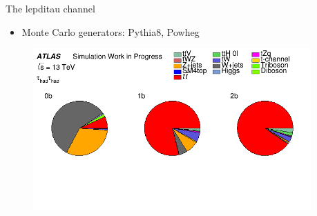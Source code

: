 \begin{frame}{The \tHq lepditau channel}
  \begin{itemize}
  \item Monte Carlo generators: Pythia8, Powheg
\end{itemize}
     \begin{figure}
        \centering
        \includegraphics[width=0.95\textwidth]{PieChart_hadhad.png}
      \end{figure}

\end{frame}


